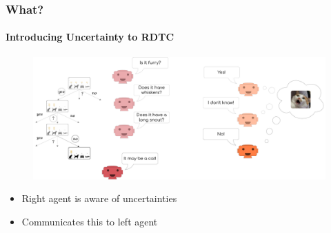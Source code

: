 \documentclass[9pt]{beamer}
\begin{document}
\begin{frame}
\frametitle{What?}
\framesubtitle{Introducing Uncertainty to RDTC}
\begin{figure}
	\centering
	\includegraphics[width=1\textwidth]{images/urdtc_intuition.pdf}
\end{figure}
\begin{itemize}%
	\item Right agent is aware of uncertainties
	\item Communicates this to left agent
\end{itemize}
\end{frame} 
\end{document}

